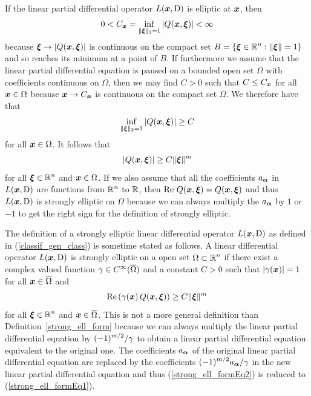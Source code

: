 \begin{rmk}
If the linear partial differential operator $L({\bm{x}}, \operatorname{D})$
is elliptic at ${\bm{x}}$, then         \label{ell_implies_strong_ell}
\[
0 < C_{{\bm{x}}}
= \inf_{\|{\bm{\xi}}\|_2 = 1} \left| Q({\bm{x}}, {\bm{\xi}}) \right| < \infty
\]
because ${\bm{\xi}} \to |Q({\bm{x}},{\bm{\xi}})|$ is continuous on the
compact set $\displaystyle B= \{{\bm{\xi}}\in \mathbb{R}^n : \|{\bm{\xi}}\| = 1\}$
and so reaches its minimum at a point of $B$.  If furthermore we
assume that the linear partial differential equation is paused on a
bounded open set $\Omega$ with coefficients continuous on
$\overline{\Omega}$,  then we may find $C>0$ such that $C \leq
C_{{\bm{x}}}$ for all ${\bm{x}} \in \Omega$ because ${\bm{x}} \to
C_{{\bm{x}}}$ is continuous on the compact set $\overline{\Omega}$.  We
therefore have that
\[
  \inf_{\|{\bm{\xi}}\|_2 = 1} \left| Q({\bm{x}}, {\bm{\xi}}) \right| \geq  C
\]
for all ${\bm{x}} \in \Omega$.  It follows that
\[
  \left| Q({\bm{x}}, {\bm{\xi}}) \right| \geq  C \|{\bm{\xi}}\|^m
\]
for all $\displaystyle {\bm{\xi}} \in \mathbb{R}^n$ and ${\bm{x}} \in \Omega$.
If we also assume that all the coefficients $a_{{\bm{\alpha}}}$ in
$L({\bm{x}},\operatorname{D})$ are functions from $\displaystyle \mathbb{R}^n$ to $\mathbb{R}$, then
$\operatorname{Re}\, Q({\bm{x}}, {\bm{\xi}}) = Q({\bm{x}}, {\bm{\xi}})$ and thus
$L({\bm{x}}, \operatorname{D})$ is strongly elliptic on $\Omega$
because we can always multiply the $a_{{\bm{\alpha}}}$ by $1$ or $-1$ to get
the right sign for the definition of strongly elliptic.
\end{rmk}

\begin{rmk}
The definition of a strongly elliptic linear differential operator
$L({\bm{x}}, \operatorname{D})$ as defined in (\ref{classif_gen_class}) is
sometime stated as follows.  A linear differential operator
$L({\bm{x}}, \operatorname{D})$ is strongly elliptic on a open
set $\displaystyle \Omega \subset \mathbb{R}^n$ if there exist a complex
valued function
$\displaystyle \gamma \in C^\infty(\overline{\Omega})$ and a constant $C>0$ such
that $|\gamma({\bm{x}})|=1$ for all ${\bm{x}} \in \overline{\Omega}$ and
\begin{equation} \label{strong_ell_formEq2}
\operatorname{Re}\left(\gamma({\bm{x}})\, Q({\bm{x}},{\bm{\xi}})\right) \geq C
\|{\bm{\xi}}\|^m
\end{equation}
for all $\displaystyle {\bm{\xi}} \in \mathbb{R}^n$ and
${\bm{x}} \in \overline{\Omega}$.
This is not a more general definition than Definition~\ref{strong_ell_form}
because we can always multiply the linear partial differential
equation by $\displaystyle (-1)^{m/2}/\gamma$ to obtain a linear partial
differential equation equivalent to the original one.  The
coefficients $a_{{\bm{\alpha}}}$ of the original linear partial differential
equation are replaced by the coefficients
$\displaystyle (-1)^{m/2} a_{{\bm{\alpha}}}/\gamma$ in the new linear partial
differential equation and thus
(\ref{strong_ell_formEq2}) is reduced to (\ref{strong_ell_formEq1}).
\end{rmk}

